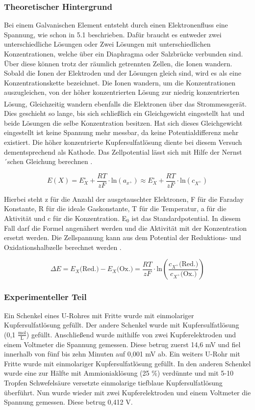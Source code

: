 \documentclass[
	a4paper,										%
	12pt,											%
	twoside,										%
	headsepline,								%
	footsepline,									%
	captions=tableheading,					%
]{scrartcl}
\newcommand{\zitat}[1]{\textsuperscript{\cite{#1}}}
\newcommand{\formel}[2]{				%
	\begin{equation}
		\label{eq: #1}							%
		#2											%
	\end{equation}}
\begin{document}
\subsubsection{Theoretischer Hintergrund}
Bei einem Galvanischen Element entsteht durch einen Elektronenfluss eine Spannung, wie schon in 5.1 beschrieben. Dafür braucht es entweder zwei unterschiedliche Lösungen oder Zwei Lösungen mit unterschiedlichen Konzentrationen, welche über ein Diaphragma oder Salzbrücke verbunden sind. Über diese können trotz der räumlich getrennten Zellen, die Ionen wandern. Sobald die Ionen der Elektroden und der Lösungen gleich sind, wird es als eine Konzentrationskette bezeichnet. Die Ionen wandern, um die Konzentrationen auszugleichen, von der höher konzentrierten Lösung zur niedrig konzentrierten Lösung, Gleichzeitig wandern ebenfalls die Elektronen über das Strommessgerät.\zitat{Seminar} Dies geschieht so lange, bis sich schließlich ein Gleichgewicht eingestellt hat und beide Lösungen die selbe Konzentration besitzen.  Hat sich dieses Gleichgewicht eingestellt ist keine Spannung mehr messbar, da keine Potentialdifferenz mehr existiert. Die höher konzentrierte Kupfersulfatlösung diente bei diesem Versuch dementsprechend als Kathode.
Das Zellpotential lässt sich mit Hilfe der Nernst´schen Gleichung berechnen .

\formel{gl1}{E(X)=E^{\circ}_X + \frac{RT}{zF}\cdot \text{ln}(a_{x^+}) \approx E^{\circ}_X +\frac{RT}{zF}\cdot \text{ln}(c_{X^+})}

Hierbei steht z für die Anzahl der ausgetauschter Elektronen, F für die Faraday Konstante, R für die ideale Gaskonstante, T für die Temperatur, a für die Aktivität und c für die Konzentration. E$_0$ ist das Standardpotential. In diesem Fall darf die Formel angenähert werden und die Aktivität mit der Konzentration ersetzt werden. 
Die Zellspannung kann aus dem Potential der Reduktions- und Oxidationshalbzelle berechnet werden .

\formel{gl2}{\Delta E=E_X\text{(Red.)} - E_X\text{(Ox.)}= \frac{RT}{zF}\cdot \text{ln}(\frac{c_{X^+}\text{(Red.)}}{c_{X^+}\text{(Ox.)}})}

\subsubsection{Experimenteller Teil}

Ein Schenkel eines U-Rohres mit Fritte wurde mit einmolariger Kupfersulfatlösung gefüllt. Der andere Schenkel wurde mit Kupfersulfatlösung (0,1 $\mathrm{\frac{mol}{L}}$) gefüllt. Anschließend wurde mithilfe von zwei Kupferelektroden und einem Voltmeter die Spannung gemessen. Diese betrug zuerst 14,6 mV und fiel innerhalb von fünf bis zehn Minuten auf 0,001 mV ab. 
Ein weiters U-Rohr mit Fritte wurde mit einmolariger Kupfersulfatlösung gefüllt. In den anderen Schenkel wurde eine zur Hälfte mit Ammioniaklösung (25 \%) verdünnte und mit 5-10 Tropfen Schwefelsäure versetzte einmolarige tiefblaue Kupfersulfatlösung überführt. Nun wurde wieder mit zwei Kupferelektroden und einem Voltmeter die Spannung gemessen. Diese betrug 0,412 V. 
\end{document}

